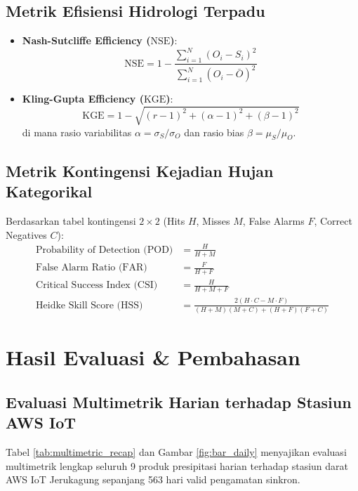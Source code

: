 \documentclass[11pt,a4paper]{article}
\begin{document}
\subsection{Metrik Efisiensi Hidrologi Terpadu}
\begin{itemize}[leftmargin=*]
    \item \textbf{Nash-Sutcliffe Efficiency ($\text{NSE}$)}:
    \begin{equation}
        \text{NSE} = 1 - \frac{\sum_{i=1}^N (O_i - S_i)^2}{\sum_{i=1}^N (O_i - \bar{O})^2}
    \end{equation}
    \item \textbf{Kling-Gupta Efficiency ($\text{KGE}$)}:
    \begin{equation}
        \text{KGE} = 1 - \sqrt{(r - 1)^2 + (\alpha - 1)^2 + (\beta - 1)^2}
    \end{equation}
    di mana rasio variabilitas $\alpha = \sigma_S / \sigma_O$ dan rasio bias $\beta = \mu_S / \mu_O$.
\end{itemize}

\subsection{Metrik Kontingensi Kejadian Hujan Kategorikal}
Berdasarkan tabel kontingensi $2 \times 2$ (Hits $H$, Misses $M$, False Alarms $F$, Correct Negatives $C$):
\begin{align}
    \text{Probability of Detection (POD)} &= \frac{H}{H + M} \\
    \text{False Alarm Ratio (FAR)} &= \frac{F}{H + F} \\
    \text{Critical Success Index (CSI)} &= \frac{H}{H + M + F} \\
    \text{Heidke Skill Score (HSS)} &= \frac{2(H \cdot C - M \cdot F)}{(H + M)(M + C) + (H + F)(F + C)}
\end{align}

\FloatBarrier

\section{Hasil Evaluasi \& Pembahasan}

\subsection{Evaluasi Multimetrik Harian terhadap Stasiun AWS IoT}
Tabel \ref{tab:multimetric_recap} dan Gambar \ref{fig:bar_daily} menyajikan evaluasi multimetrik lengkap seluruh 9 produk presipitasi harian terhadap stasiun darat AWS IoT Jerukagung sepanjang 563 hari valid pengamatan sinkron.
\end{document}

